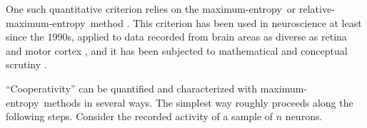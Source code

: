 \documentclass[\ifafour a4paper,12pt,\else a5paper,10pt,\fi%
onecolumn,oneside,article,%
british%
]{memoir}
\theoremstyle{remark}
\theoremstyle{innote}
\newcommand*{\citep}{\parencites}
\renewcommand*{\|}{\nonscript\,\vert\nonscript\;\mathopen{}}
\newcommand*{\me}{maximum-entropy}
\begin{document}
One such quantitative criterion relies on the \me\ or relative-\me\ method
\citep{jaynes1957,jaynes1963,hobsonetal1973,sivia1996_r2006,meadetal1984}.
This criterion has been used in neuroscience at least since the 1990s,
applied to data recorded from brain areas as diverse as retina and motor
cortex
\citep{mackay1991,martignonetal1995,bohteetal2000,amarietal2003,schneidmanetal2006,shlensetal2006,mackeetal2009b,roudietal2009c,tkaciketal2009,gerwinnetal2009,mackeetal2011,mackeetal2011b,ganmoretal2011,granotatedgietal2013,tkaciketal2014b,moraetal2015,shimazakietal2015},
and it has been subjected to mathematical and conceptual scrutiny
\citep{tkaciketal2006,roudietal2009,roudietal2009b,barreiroetal2010,barreiroetal2010b,mackeetal2013,rostamietal2016_r2017}.

\enquote{Cooperativity} can be quantified and characterized with \me\
methods in several ways. The simplest way roughly proceeds along the
following steps. Consider the recorded activity of a sample of $n$ neurons.
\end{document}
